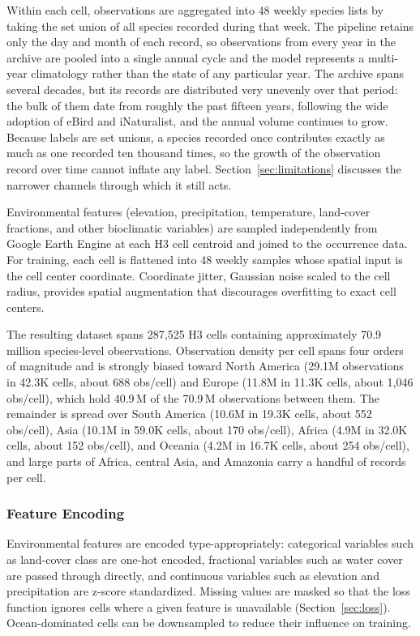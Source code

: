 Within each cell, observations are aggregated into 48 weekly species lists by taking the set union of all species recorded during that week. The pipeline retains only the day and month of each record, so observations from every year in the archive are pooled into a single annual cycle and the model represents a multi-year climatology rather than the state of any particular year. The archive spans several decades, but its records are distributed very unevenly over that period: the bulk of them date from roughly the past fifteen years, following the wide adoption of eBird and iNaturalist, and the annual volume continues to grow. Because labels are set unions, a species recorded once contributes exactly as much as one recorded ten thousand times, so the growth of the observation record over time cannot inflate any label. Section~\ref{sec:limitations} discusses the narrower channels through which it still acts.

Environmental features (elevation, precipitation, temperature, land-cover fractions, and other bioclimatic variables) are sampled independently from Google Earth Engine \citep{crego2022implementation} at each H3 cell centroid and joined to the occurrence data. For training, each cell is flattened into 48 weekly samples whose spatial input is the cell center coordinate. Coordinate jitter, Gaussian noise scaled to the cell radius, provides spatial augmentation that discourages overfitting to exact cell centers.

The resulting dataset spans 287,525 H3 cells containing approximately 70.9 million species-level observations. Observation density per cell spans four orders of magnitude and is strongly biased toward North America (29.1M observations in 42.3K cells, about 688 obs/cell) and Europe (11.8M in 11.3K cells, about 1,046 obs/cell), which hold 40.9\,M of the 70.9\,M observations between them. The remainder is spread over South America (10.6M in 19.3K cells, about 552 obs/cell), Asia (10.1M in 59.0K cells, about 170 obs/cell), Africa (4.9M in 32.0K cells, about 152 obs/cell), and Oceania (4.2M in 16.7K cells, about 254 obs/cell), and large parts of Africa, central Asia, and Amazonia carry a handful of records per cell.

\subsubsection{Feature Encoding}
\label{sec:features}

Environmental features are encoded type-appropriately: categorical variables such as land-cover class are one-hot encoded, fractional variables such as water cover are passed through directly, and continuous variables such as elevation and precipitation are z-score standardized. Missing values are masked so that the loss function ignores cells where a given feature is unavailable (Section~\ref{sec:loss}). Ocean-dominated cells can be downsampled to reduce their influence on training.

